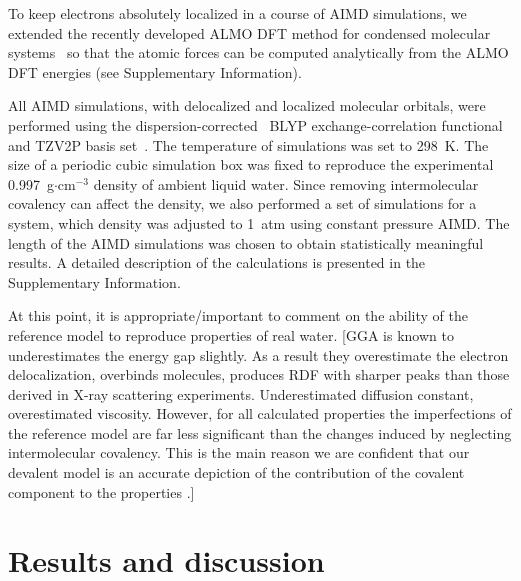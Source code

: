 \documentclass[aps,prl,reprint,amsmath,amssymb]{revtex4-1}
\begin{document}
To keep electrons absolutely localized in a course of AIMD simulations, we extended the recently developed ALMO DFT method for  condensed molecular systems~\cite{Khaliullin2013JCTC} so that the atomic forces can be computed analytically from the ALMO DFT energies (see Supplementary Information).

All AIMD simulations, with delocalized and localized molecular orbitals, were performed using the dispersion-corrected~\cite{grimme2010consistent} BLYP exchange-correlation functional~\cite{becke1988density} and TZV2P basis set~\cite{vandevondele2007gaussian}. 
The temperature of simulations was set to 298~K. 
The size of a periodic cubic simulation box was fixed to reproduce the experimental 0.997~g$\cdot$cm$^{-3}$ density of ambient liquid water. 
Since removing intermolecular covalency can affect the density, we also performed a set of simulations for a system, which density was adjusted to 1~atm using constant pressure AIMD. 
The length of the AIMD simulations was chosen to obtain statistically meaningful results. 
A detailed description of the calculations is presented in the Supplementary Information.


At this point, it is appropriate/important to comment on the ability of the reference model to reproduce properties of real water. 
[GGA is known to underestimates the energy gap slightly. 
As a result they overestimate the electron delocalization, overbinds molecules, produces RDF with sharper peaks than those derived in X-ray scattering experiments. 
Underestimated diffusion constant, overestimated viscosity. 
However, for all calculated properties the imperfections of the reference model are far less significant than the changes induced by neglecting intermolecular covalency. 
This is the main reason we are confident that our devalent model is an accurate depiction of the contribution of the covalent component to the properties .]


\section{Results and discussion}
\end{document}
